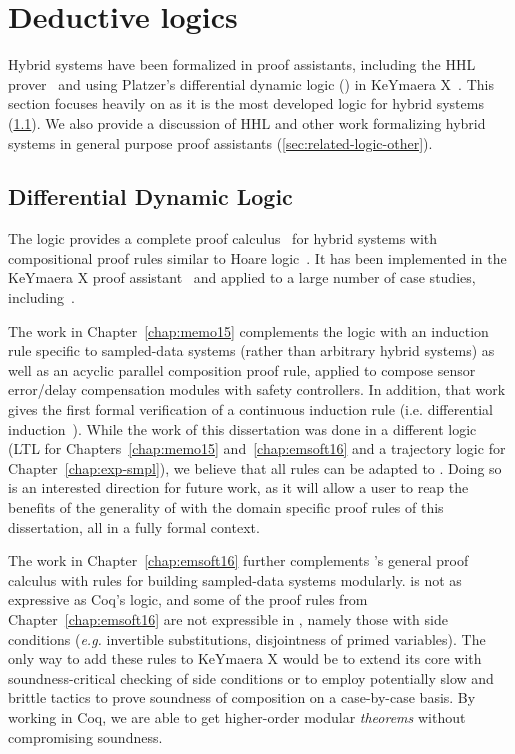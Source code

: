 \section{Deductive logics}
Hybrid systems have been formalized in proof assistants, including the HHL
prover~\cite{LiuHHL10,WangHHL2015} and using Platzer's differential dynamic
logic (\dL{}) in KeYmaera X~\cite{KeYmaeraX}. This section focuses heavily
on \dL{} as it is the most developed logic for hybrid systems
(\ref{sec:related-logic-dl}). We also provide a discussion of HHL and other
work formalizing hybrid systems in general purpose proof assistants
(\ref{sec:related-logic-other}).

\subsection{Differential Dynamic Logic}
\label{sec:related-logic-dl}
The \dL{} logic provides a complete proof
calculus~\cite{Platzer15substitution} for hybrid systems with compositional
proof rules similar to Hoare logic~\cite{hoare1971find}.  It has been
implemented in the KeYmaera X proof assistant~\cite{KeYmaeraX} and applied
to a large number of case studies,
including~\cite{platzercruise11,platzer2009formal,platzerrobots13,Arechiga12refinement}.

The work in Chapter~\ref{chap:memo15} complements the \dL{} logic with an
induction rule specific to sampled-data systems (rather than arbitrary
hybrid systems) as well as an acyclic parallel composition proof rule,
applied to compose sensor error/delay compensation modules with safety
controllers. In addition, that work gives the first formal verification of
a continuous induction rule (i.e. differential
induction~\cite{platzer2010logical,Platzer10DAL}). While the work of this
dissertation was done in a different logic (LTL for
Chapters~\ref{chap:memo15} and~\ref{chap:emsoft16} and a trajectory logic
for Chapter~\ref{chap:exp-smpl}), we believe that all rules can be adapted
to \dL{}. Doing so is an interested direction for future work, as it will
allow a user to reap the benefits of the generality of \dL{} with the
domain specific proof rules of this dissertation, all in a fully formal
context.

The work in Chapter~\ref{chap:emsoft16} further complements \dL{}'s general
proof calculus with rules for building sampled-data systems modularly.
\dL{} is not as expressive as Coq's logic, and some of the proof rules from
Chapter~\ref{chap:emsoft16} are not expressible in \dL{}, namely those with
side conditions (\emph{e.g.}  invertible substitutions, disjointness of
primed variables).  The only way to add these rules to KeYmaera X would be
to extend its core with soundness-critical checking of side conditions or
to employ potentially slow and brittle tactics to prove soundness of
composition on a case-by-case basis.  By working in Coq, we are able to get
higher-order modular \emph{theorems} without compromising soundness.

